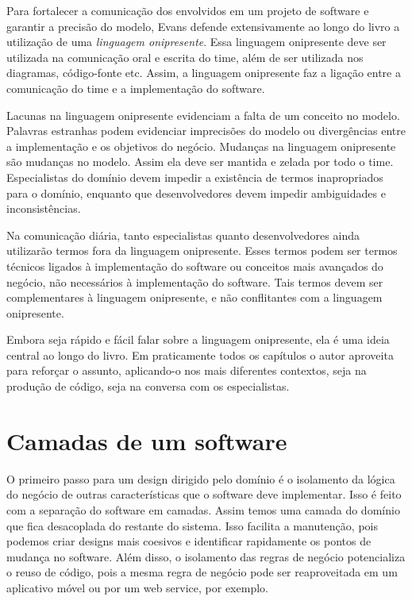 \documentclass[a4paper, 12pt]{article}
\newcommand{\lgg}{linguagem onipresente\xspace}
\begin{document}
Para fortalecer a comunicação dos envolvidos em um projeto de software e garantir a precisão do modelo, Evans defende extensivamente ao longo do livro a utilização de uma \emph{linguagem onipresente}. Essa linguagem onipresente deve ser utilizada na comunicação oral e escrita do time, além de ser utilizada nos diagramas, código-fonte etc. Assim, a \lgg faz a ligação entre a comunicação do time e a implementação do software.

Lacunas na linguagem onipresente evidenciam a falta de um conceito no modelo. Palavras estranhas podem evidenciar imprecisões do modelo ou divergências entre a implementação e os objetivos do negócio. Mudanças na linguagem onipresente são mudanças no modelo. Assim ela deve ser mantida e zelada por todo o time. Especialistas do domínio devem impedir a existência de termos inapropriados para o domínio, enquanto que desenvolvedores devem impedir ambiguidades e inconsistências.

Na comunicação diária, tanto especialistas quanto desenvolvedores ainda utilizarão termos fora da linguagem onipresente. Esses termos podem ser termos técnicos ligados à implementação do software ou conceitos mais avançados do negócio, não necessários à implementação do software. Tais termos devem ser complementares à linguagem onipresente, e não conflitantes com a linguagem onipresente.

Embora seja rápido e fácil falar sobre a \lgg, ela é uma ideia central ao longo do livro. Em praticamente todos os capítulos o autor aproveita para reforçar o assunto, aplicando-o nos mais diferentes contextos, seja na produção de código, seja na conversa com os especialistas.


\section{Camadas de um software}

O primeiro passo para um design dirigido pelo domínio é o isolamento da lógica do negócio de outras características que o software deve implementar. Isso é feito com a separação do software em camadas. Assim temos uma camada do domínio que fica desacoplada do restante do sistema. Isso facilita a manutenção, pois podemos criar designs mais coesivos e identificar rapidamente os pontos de mudança no software. Além disso, o isolamento das regras de negócio potencializa o reuso de código, pois a mesma regra de negócio pode ser reaproveitada em um aplicativo móvel ou por um web service, por exemplo.
\end{document}
